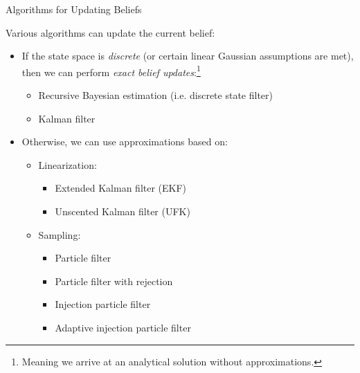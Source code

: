 
\begin{frame}{Algorithms for Updating Beliefs}

Various algorithms can update the current belief:
\begin{itemize}
    \pause \item If the state space is \textit{discrete} (or certain linear Gaussian assumptions are met), then we can perform \textit{exact belief updates}:\footnote{Meaning we arrive at an analytical solution without approximations.}
    \begin{itemize}
        \item Recursive Bayesian estimation (i.e. discrete state filter)
        \item Kalman filter
    \end{itemize}
    \pause \item Otherwise, we can use approximations based on:
    \pause \begin{itemize}
        \item Linearization:
        \begin{itemize}
            \item Extended Kalman filter (EKF)
            \item Unscented Kalman filter (UFK)
        \end{itemize}
    \end{itemize}
    \pause \begin{itemize}
        \item Sampling:
        \begin{itemize}
            \item Particle filter
            \item Particle filter with rejection
            \item Injection particle filter
            \item Adaptive injection particle filter
        \end{itemize}
    \end{itemize}
\end{itemize}

\end{frame}